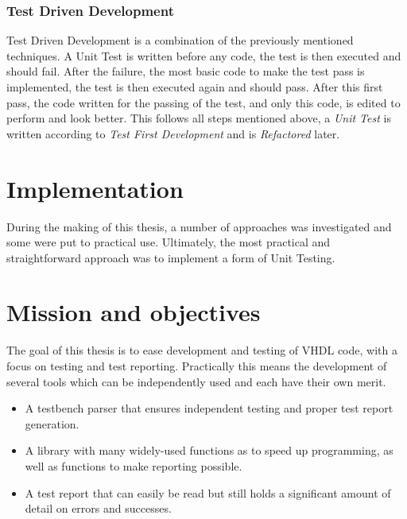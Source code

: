 \documentclass[11pt,british]{article}
\begin{document}
\subsubsection{Test Driven Development}
Test Driven Development is a combination of the previously mentioned techniques. A Unit Test is written before any code, the test is then executed and should fail. After the failure, the most basic code to make the test pass is implemented, the test is then executed again and should pass. After this first pass, the code written for the passing of the test, and only this code, is edited to perform and look better. This follows all steps mentioned above, a \emph{Unit Test} is written according to \emph{Test First Development} and is \emph{Refactored} later.

\section{Implementation}
During the making of this thesis, a number of approaches was investigated and some were put to practical use. Ultimately, the most practical and straightforward approach was to implement a form of Unit Testing.

\section{Mission and objectives}

The goal of this thesis is to ease development and testing of VHDL
code, with a focus on testing and test reporting. Practically this
means the development of several tools which can be independently
used and each have their own merit.
\begin{itemize}
\item A testbench parser that ensures independent testing and proper test
report generation.
\item A library with many widely-used functions as to speed up programming,
as well as functions to make reporting possible.
\item A test report that can easily be read but still holds a significant
amount of detail on errors and successes.\end{itemize}
\end{document}

